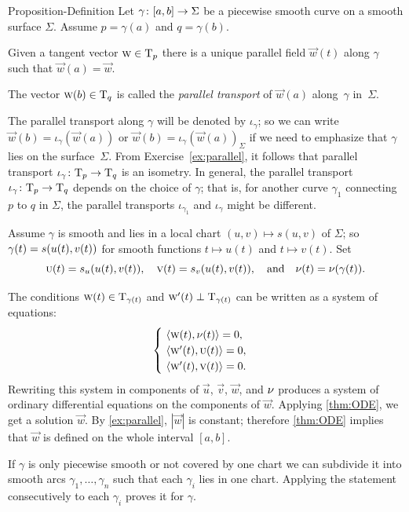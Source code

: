 \begin{thm}{Proposition-Definition}\label{prop:parallel}
Let $\gamma\:[a,b]\z\to \Sigma$ be a piecewise smooth curve on a smooth surface $\Sigma$.
Assume $p=\gamma(a)$ and $q=\gamma(b)$.

Given a tangent vector ${\text{\sc{w}}}\in\mathrm{T}_p$ there is a unique parallel field ${\vec w}(t)$ along $\gamma$ such that ${\vec w}(a)={\vec w}$.

The vector ${\text{\sc{w}}}(b)\in\mathrm{T}_q$ is called the \emph{parallel transport} of ${\vec w}(a)$ along~$\gamma$ in~$\Sigma$.
\end{thm}



The parallel transport along $\gamma$ will be denoted by $\iota_\gamma$;
so we can write $\vec w(b)=\iota_\gamma({\vec w}(a))$ or $\vec w(b)=\iota_\gamma({\vec w}(a))_\Sigma$ if we need to emphasize that $\gamma$ lies on the surface~$\Sigma$.
From Exercise~\ref{ex:parallel}, it follows that parallel transport $\iota_\gamma\:\T_p\z\to\T_q$ is an isometry.
In general, the parallel transport $\iota_\gamma\:\T_p\z\to\T_q$ depends on the choice of $\gamma$; that is, for another curve $\gamma_1$ connecting $p$ to $q$ in $\Sigma$, the parallel transports $\iota_{\gamma_1}$ and $\iota_{\gamma}$ might be different.

Assume $\gamma$ is smooth and lies in a local chart $(u,v)\mapsto s(u,v)$ of $\Sigma$;
so $\gamma(t)\z=s(u(t),v(t))$ for smooth functions $t\mapsto u(t)$ and $t\mapsto v(t)$.
Set 
\[
\text{\sc{u}}(t)=s_u(u(t),v(t)),
\quad
\text{\sc{v}}(t)=s_v(u(t),v(t)),
\quad
\text{and}
\quad
\nu(t)=\nu(\gamma(t)).
\]

The conditions $\text{\sc{w}}(t)\in \mathrm{T}_{\gamma(t)}$ and $\text{\sc{w}}'(t)\perp \mathrm{T}_{\gamma(t)}$ can be written as a system of equations:
\[
\begin{cases}
\ \langle\text{\sc{w}}(t), \nu(t)\rangle=0,
\\
\ \langle\text{\sc{w}}'(t), \text{\sc{u}}(t)\rangle=0,
\\
\ \langle\text{\sc{w}}'(t), \text{\sc{v}}(t)\rangle=0.
\end{cases}
\]
Rewriting this system in components of $\vec u$, $\vec v$, $\vec w$, and $\nu$ produces a system of ordinary differential equations on the components of $\vec w$.
Applying \ref{thm:ODE}, we get a solution $\vec w$.
By \ref{ex:parallel}, $|\vec w|$ is constant;
therefore \ref{thm:ODE} implies that $\vec w$ is defined on the whole interval $[a,b]$.

If $\gamma$ is only piecewise smooth or not covered by one chart we can subdivide it into smooth arcs $\gamma_1,\dots,\gamma_n$ such that each $\gamma_i$ lies in one chart.
Applying the statement consecutively to each $\gamma_i$ proves it for $\gamma$.
\qeds

